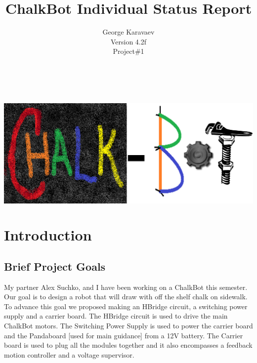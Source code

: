\documentclass[12pt]{article}
\title{ChalkBot Individual Status Report}
\author{George Karavaev\\ \normalsize Version 4.2f \\Project\#1}
\begin{document}
  \maketitle 
\\
\\
{\centering
\includegraphics[width=1.0\textwidth]{../chalk_bot_logo2.png}
}
\newpage
 \tableofcontents
\listoffigures
\newpage
 \section{Introduction}
 \subsection{Brief Project Goals}
 My partner Alex Suchko, and I have been working on a ChalkBot this semester. Our goal is to design a robot that will draw with off the shelf chalk on sidewalk. To advance this goal we proposed making an HBridge circuit, a switching power supply and a carrier board. The HBridge circuit is used to drive the main ChalkBot motors. The Switching Power Supply is used to power the carrier board and the Pandaboard [used for main guidance] from a 12V battery. The Carrier board is used to plug all the modules together and it also encompasses a feedback motion controller and a voltage supervisor.
\end{document}
